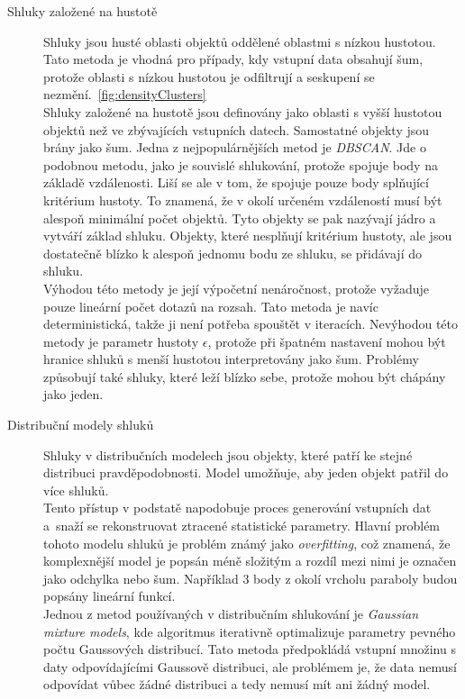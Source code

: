 \begin{description}
\item[Shluky založené na hustotě] Shluky jsou husté oblasti objektů oddělené oblastmi s nízkou hustotou. Tato metoda je vhodná pro případy, kdy vstupní data obsahují šum, protože oblasti s nízkou hustotou je odfiltrují a seskupení se nezmění.~\autoref{fig:densityClusters} \\
Shluky založené na hustotě jsou definovány jako oblasti s vyšší hustotou objektů než ve zbývajících vstupních datech. Samostatné objekty jsou brány jako šum. Jedna z nejpopulárnějších metod je \textit{DBSCAN}. Jde o podobnou metodu, jako je souvislé shlukování, protože spojuje body na základě vzdálenosti. Liší se ale v tom, že spojuje pouze body splňující kritérium hustoty. To znamená, že v okolí určeném vzdáleností musí být alespoň minimální počet objektů. Tyto objekty se pak nazývají jádro a vytváří základ shluku. Objekty, které nesplňují kritérium hustoty, ale jsou dostatečně blízko k alespoň jednomu bodu ze shluku, se přidávají do shluku. \\
Výhodou této metody je její výpočetní nenáročnost, protože vyžaduje pouze lineární počet dotazů na rozsah. Tato metoda je navíc deterministická, takže ji není potřeba spouštět v iteracích.
Nevýhodou této metody je parametr hustoty $\epsilon$, protože při špatném nastavení mohou být hranice shluků s menší hustotou interpretovány jako šum. Problémy způsobují také shluky, které leží blízko sebe, protože mohou být chápány jako jeden.

\item[Distribuční modely shluků] Shluky v distribučních modelech jsou objekty, kte\-ré patří ke stejné distribuci pravděpodobnosti. Model umožňuje, aby jeden objekt patřil do více shluků. \\
Tento přístup v podstatě napodobuje proces generování vstupních dat a~sna\-ží se rekonstruovat ztracené statistické parametry. Hlavní problém tohoto modelu shluků je problém známý jako \textit{overfitting}, což znamená, že komplexnější model je popsán méně složitým a rozdíl mezi nimi je označen jako odchylka nebo šum. Například 3 body z okolí vrcholu paraboly budou popsány lineární funkcí. \\
Jednou z metod používaných v distribučním shlukování je \textit {Gaussian mixture models}, kde algoritmus iterativně optimalizuje parametry pevného počtu Gaussových distribucí.
Tato metoda předpokládá vstupní množinu s daty odpovídajícími Gaussově distribuci, ale problémem je, že data nemusí od\-po\-ví\-dat vůbec žádné distribuci a tedy nemusí mít ani žádný model.


\end{description}
